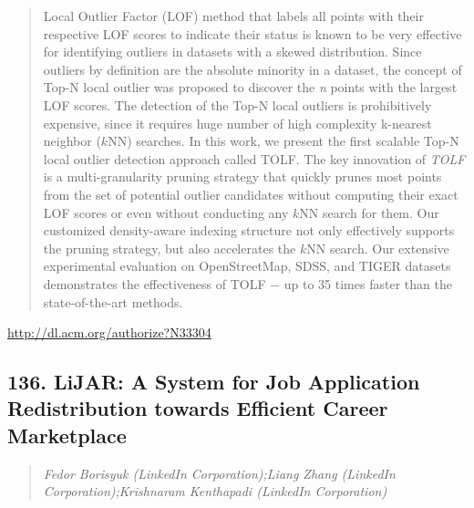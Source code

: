 \documentclass{article}
\begin{document}
\begin{quote}
Local Outlier Factor (LOF) method that labels all points with their respective LOF scores to indicate their status is known to be very effective for identifying outliers in datasets with a skewed distribution. Since outliers by definition are the absolute minority in a dataset, the concept of Top-N local outlier was proposed to discover the \textit{n} points with the largest LOF scores. The detection of the Top-N local outliers is prohibitively expensive, since it requires huge number of high complexity k-nearest neighbor ($k$NN) searches. In this work, we present the first scalable Top-N local outlier detection approach called TOLF. The key innovation of \textit{TOLF} is a multi-granularity pruning strategy that quickly prunes most points from the set of potential outlier candidates without computing their exact LOF scores or even without conducting any $k$NN search for them. Our customized density-aware indexing structure not only effectively supports the pruning strategy, but also accelerates the $k$NN search. Our extensive experimental evaluation on OpenStreetMap, SDSS, and TIGER datasets demonstrates the effectiveness of TOLF $-$ up to 35 times faster than the state-of-the-art methods.
\end{quote}

\href{http://dl.acm.org/authorize?N33304}{http://dl.acm.org/authorize?N33304}

\subsection{136. LiJAR: A System for Job Application Redistribution towards Efficient Career Marketplace}

\begin{quote}
\footnotesize{\textit{Fedor Borisyuk (LinkedIn Corporation);Liang Zhang (LinkedIn Corporation);Krishnaram Kenthapadi (LinkedIn Corporation)}}

\end{quote}
\end{document}
